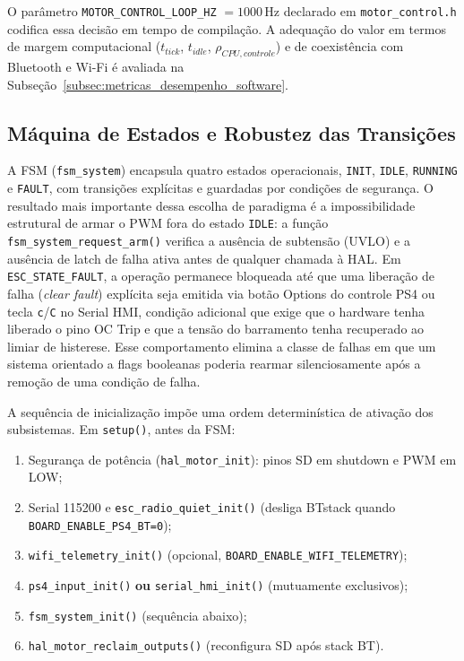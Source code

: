 O parâmetro \texttt{MOTOR\_CONTROL\_LOOP\_HZ} $= 1000\,\text{Hz}$ declarado em \texttt{motor\_control.h} codifica essa decisão em tempo de compilação. A adequação do valor em termos de margem computacional ($t_{tick}$, $t_{idle}$, $\rho_{CPU,controle}$) e de coexistência com Bluetooth e Wi-Fi é avaliada na Subseção~\ref{subsec:metricas_desempenho_software}.

\subsection{Máquina de Estados e Robustez das Transições}

A FSM (\texttt{fsm\_system}) encapsula quatro estados operacionais, \texttt{INIT}, \texttt{IDLE}, \texttt{RUNNING} e \texttt{FAULT}, com transições explícitas e guardadas por condições de segurança. O resultado mais importante dessa escolha de paradigma é a impossibilidade estrutural de armar o PWM fora do estado \texttt{IDLE}: a função \texttt{fsm\_system\_request\_arm()} verifica a ausência de subtensão (UVLO) e a ausência de latch de falha ativa antes de qualquer chamada à HAL. Em \texttt{ESC\_STATE\_FAULT}, a operação permanece bloqueada até que uma liberação de falha (\textit{clear fault}) explícita seja emitida via botão Options do controle PS4 ou tecla \texttt{c}/\texttt{C} no Serial HMI, condição adicional que exige que o hardware tenha liberado o pino OC Trip e que a tensão do barramento tenha recuperado ao limiar de histerese. Esse comportamento elimina a classe de falhas em que um sistema orientado a flags booleanas poderia rearmar silenciosamente após a remoção de uma condição de falha.

A sequência de inicialização impõe uma ordem determinística de ativação dos subsistemas. Em \texttt{setup()}, antes da FSM:

\begin{enumerate}
    \item Segurança de potência (\texttt{hal\_motor\_init}): pinos SD em shutdown e PWM em LOW;
    \item Serial 115200 e \texttt{esc\_radio\_quiet\_init()} (desliga BTstack quando \texttt{BOARD\_ENABLE\_PS4\_BT=0});
    \item \texttt{wifi\_telemetry\_init()} (opcional, \texttt{BOARD\_ENABLE\_WIFI\_TELEMETRY});
    \item \texttt{ps4\_input\_init()} \textbf{ou} \texttt{serial\_hmi\_init()} (mutuamente exclusivos);
    \item \texttt{fsm\_system\_init()} (sequência abaixo);
    \item \texttt{hal\_motor\_reclaim\_outputs()} (reconfigura SD após stack BT).
\end{enumerate}

